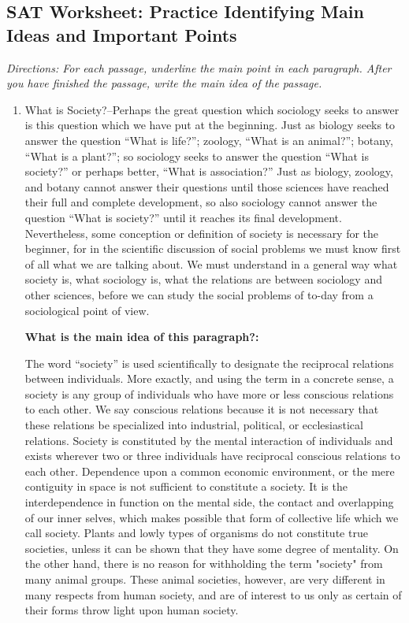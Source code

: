 \subsection{\sloppy SAT Worksheet: Practice Identifying Main Ideas and Important Points}

\textit{Directions: For each passage, underline the main point in each paragraph. After you have finished the passage, write the main idea of the passage.}

\begin{enumerate}
\item 
\begin{linenumbers}
\modulolinenumbers[5]
\indent What is Society?--Perhaps the great question which sociology seeks to answer is this question which we have put at the beginning. Just as biology seeks to answer the question ``What is life?''; zoology, ``What is an animal?''; botany, ``What is a plant?''; so sociology seeks to answer the question ``What is society?'' or perhaps better, ``What is association?'' Just as biology, zoology, and botany cannot answer their questions until those sciences have reached their full and complete development, so also sociology cannot answer the question ``What is society?'' until it reaches its final development. Nevertheless, some conception or definition of society is necessary for the beginner, for in the scientific discussion of social problems we must know first of all what we are talking about. We must understand in a general way what society is, what sociology is, what the relations are between sociology and other sciences, before we can study the social problems of to-day from a sociological point of view.

\textbf{What is the main idea of this paragraph?:} \hrulefill

\hrulefill

\indent The word ``society'' is used scientifically to designate the reciprocal relations between individuals. More exactly, and using the term in a concrete sense, a society is any group of individuals who have more or less conscious relations to each other. We say conscious relations because it is not necessary that these relations be specialized into industrial, political, or ecclesiastical relations. Society is constituted by the mental interaction of individuals and exists wherever two or three individuals have reciprocal conscious relations to each other. Dependence upon a common economic environment, or the mere contiguity in space is not sufficient to constitute a society. It is the interdependence in function on the mental side, the contact and overlapping of our inner selves, which makes possible that form of collective life which we call society. Plants and lowly types of organisms do not constitute true societies, unless it can be shown that they have some degree of mentality. On the other hand, there is no reason for withholding the term "society" from many animal groups. These animal societies, however, are very different in many respects from human society, and are of interest to us only as certain of their forms throw light upon human society.


\end{linenumbers}
\end{enumerate}
